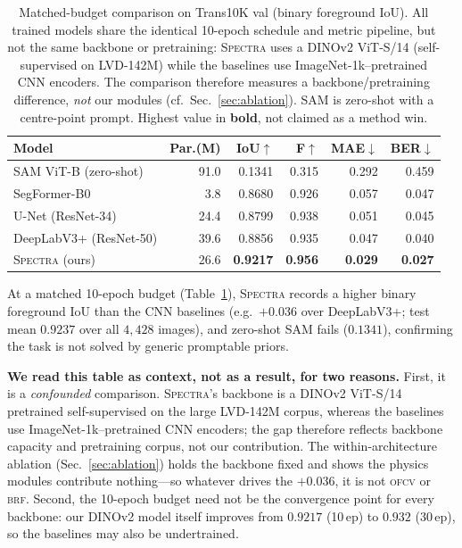 \documentclass[conference]{IEEEtran}
\newcommand{\spectra}{\textsc{Spectra}}
\newcommand{\ofcv}{\textsc{ofcv}}
\newcommand{\brf}{\textsc{brf}}
\newcommand{\dinov}{DINOv2}
\newcommand{\iou}{IoU}
\newcommand{\best}[1]{\textbf{#1}}
\begin{document}
\begin{table}[t]
\centering
\caption{Matched-budget comparison on Trans10K val (binary foreground
\iou). All trained models share the identical 10-epoch schedule and metric
pipeline, but not the same backbone or pretraining: \spectra{} uses a
\dinov{} ViT-S/14 (self-supervised on LVD-142M) while the baselines use
ImageNet-1k--pretrained CNN encoders. The comparison therefore measures a
backbone/pretraining difference, \emph{not} our modules (cf.\ Sec.~\ref{sec:ablation}).
SAM is zero-shot with a centre-point prompt. Highest value in \textbf{bold}, not
claimed as a method win.}
\label{tab:main}
\setlength{\tabcolsep}{4.5pt}
\begin{tabular}{lrrrrr}
\toprule
Model & Par.(M) & \iou$\uparrow$ & F$\uparrow$ & MAE$\downarrow$ & BER$\downarrow$ \\
\midrule
SAM ViT-B (zero-shot) & 91.0 & 0.1341 & 0.315 & 0.292 & 0.459 \\
SegFormer-B0 & 3.8 & 0.8680 & 0.926 & 0.057 & 0.047 \\
U-Net (ResNet-34) & 24.4 & 0.8799 & 0.938 & 0.051 & 0.045 \\
DeepLabV3+ (ResNet-50) & 39.6 & 0.8856 & 0.935 & 0.047 & 0.040 \\
\spectra{} (ours) & 26.6 & \best{0.9217} & \best{0.956} & \best{0.029} & \best{0.027} \\
\bottomrule
\end{tabular}
\end{table}

At a matched 10-epoch budget (Table~\ref{tab:main}), \spectra{} records a higher
binary foreground \iou{} than the CNN baselines (e.g.\ $+0.036$ over DeepLabV3+;
test mean $0.9237$ over all $4{,}428$ images), and zero-shot SAM fails
($0.1341$), confirming the task is not solved by generic promptable priors.

\textbf{We read this table as context, not as a result, for two reasons.}
First, it is a \emph{confounded} comparison. \spectra{}'s backbone is a \dinov{}
ViT-S/14 pretrained self-supervised on the large LVD-142M corpus, whereas the
baselines use ImageNet-1k--pretrained CNN encoders; the gap therefore reflects
backbone capacity and pretraining corpus, not our contribution. The
within-architecture ablation (Sec.~\ref{sec:ablation}) holds the backbone fixed
and shows the physics modules contribute nothing---so whatever drives the
$+0.036$, it is not \ofcv{} or \brf. Second, the 10-epoch budget need not be the
convergence point for every backbone: our \dinov{} model itself improves from
$0.9217$ (10\,ep) to $0.932$ (30\,ep), so the baselines may also be undertrained.
\end{document}
